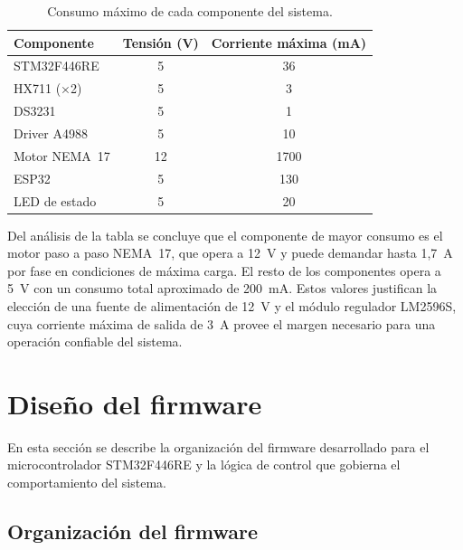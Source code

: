 \vspace{0.2cm}

\begin{table}[H]
\centering
\caption{Consumo máximo de cada componente del sistema.}
\label{tab:consumo}
\begin{tabular}{lcc}
\toprule
\textbf{Componente} & \textbf{Tensión (V)} & \textbf{Corriente máxima (mA)} \\
\midrule
STM32F446RE       & 5  & 36   \\
HX711 (×2)        & 5  & 3    \\
DS3231            & 5  & 1    \\
Driver A4988      & 5  & 10   \\
Motor NEMA~17     & 12 & 1700 \\
ESP32             & 5  & 130  \\
LED de estado     & 5  & 20   \\
\bottomrule
\end{tabular}
\end{table}

\vspace{0.2cm}

Del análisis de la tabla se concluye que el componente de mayor consumo es
el motor paso a paso NEMA~17, que opera a 12~V y puede demandar hasta 1,7~A
por fase en condiciones de máxima carga. El resto de los componentes opera a
5~V con un consumo total aproximado de 200~mA. Estos valores justifican la
elección de una fuente de alimentación de 12~V y el módulo regulador LM2596S,
cuya corriente máxima de salida de 3~A provee el margen necesario para una
operación confiable del sistema.

\section{Diseño del firmware}

En esta sección se describe la organización del firmware desarrollado para el microcontrolador STM32F446RE y la lógica de control que gobierna el comportamiento del sistema.

\subsection{Organización del firmware}

